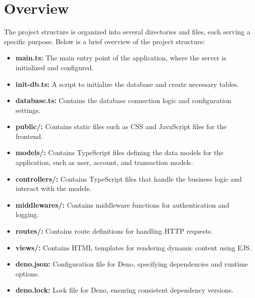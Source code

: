 \documentclass[12pt,a4paper]{report}
\begin{document}
\section{Overview}
The project structure is organized into several directories and files, each serving a
specific purpose. Below is a brief overview of the project structure:
\begin{itemize}
    \item \textbf{main.ts:} The main entry point of the application, where the server is
    initialized and configured.
    \item \textbf{init-db.ts:} A script to initialize the database and create necessary
    tables.
    \item \textbf{database.ts:} Contains the database connection logic and configuration
    settings.
    \item \textbf{public/:} Contains static files such as CSS and JavaScript files for the
    frontend.
    \item \textbf{models/:} Contains TypeScript files defining the data models for the
    application, such as user, account, and transaction models.
    \item \textbf{controllers/:} Contains TypeScript files that handle the business logic
    and interact with the models.
    \item \textbf{middlewares/:} Contains middleware functions for authentication and
    logging.
    \item \textbf{routes/:} Contains route definitions for handling HTTP requests.
    \item \textbf{views/:} Contains HTML templates for rendering dynamic content using EJS.
    \item \textbf{deno.json:} Configuration file for Deno, specifying dependencies and
    runtime options.
    \item \textbf{deno.lock:} Lock file for Deno, ensuring consistent dependency versions.
\end{itemize}
\end{document}
